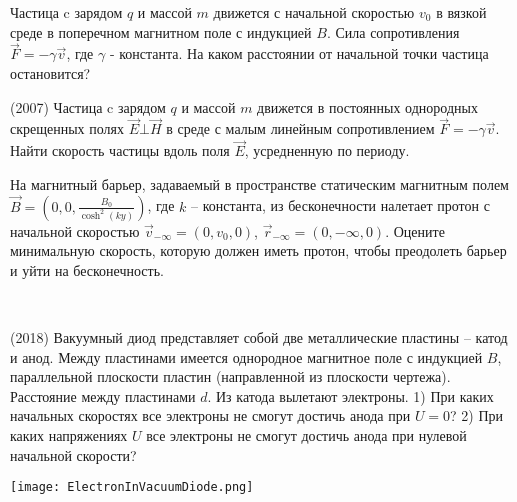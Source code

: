 \begin{ex}
Частица c зарядом $q$ и массой $m$ движется с начальной скоростью $v_0$ в вязкой среде в поперечном магнитном поле с индукцией $B$. Сила сопротивления $\vec{F} = -\gamma \vec{v}$, где $\gamma$ - константа. На каком расстоянии от начальной точки частица остановится?
\begin{ans}
\end{ans}
\end{ex}

\begin{ex}
(2007) Частица c зарядом $q$ и массой $m$ движется в постоянных однородных скрещенных полях $\vec{E} \bot \vec{H}$ в среде с малым линейным сопротивлением $\vec{F} = -\gamma \vec{v}$. Найти скорость частицы вдоль поля $\vec{E}$, усредненную по периоду.
\begin{ans}
\end{ans}
\end{ex}

\begin{ex}
На магнитный барьер, задаваемый в пространстве статическим магнитным полем $\vec{B} = \left(0, 0, \frac{B_0}{\cosh^2(ky)}\right)$, где $k$ -- константа, из бесконечности налетает протон с начальной скоростью $\vec{v}_{-\infty} = (0, v_0, 0)$, $\vec{r}_{-\infty} = (0, -\infty, 0)$. Оцените минимальную скорость, которую должен иметь протон, чтобы преодолеть барьер и уйти на бесконечность. 
\begin{ans}
\end{ans}
\end{ex}

\begin{ex}
\hspace{0pt} \\
\begin{minipage}{.65\textwidth}
(2018) Вакуумный диод представляет собой две металлические пластины -- катод и анод. Между пластинами имеется однородное магнитное поле с индукцией $B$, параллельной плоскости пластин (направленной из плоскости чертежа). Расстояние между пластинами $d$. Из катода вылетают электроны. 1) При каких начальных скоростях все электроны не смогут достичь анода при $U = 0$? 2) При каких напряжениях $U$ все электроны не смогут достичь анода при нулевой начальной скорости?
\end{minipage}
\begin{minipage}{.35\textwidth}
\centering
\texttt{[image: ElectronInVacuumDiode.png]}
\end{minipage}
\begin{ans}
\end{ans}
\end{ex}

